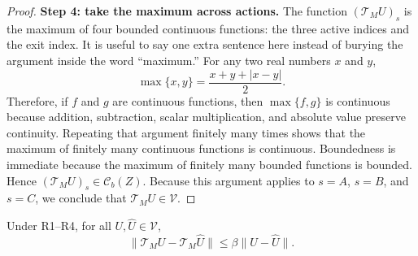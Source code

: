 \begin{proof}
\medskip\noindent\textbf{Step 4: take the maximum across actions.}
The function $(\mathcal T_MU)_s$ is the maximum of four bounded continuous functions: the three active indices and the exit index. It is useful to say one extra sentence here instead of burying the argument inside the word ``maximum.'' For any two real numbers $x$ and $y$,
\[
\max\{x,y\}=\frac{x+y+|x-y|}{2}.
\]
Therefore, if $f$ and $g$ are continuous functions, then $\max\{f,g\}$ is continuous because addition, subtraction, scalar multiplication, and absolute value preserve continuity. Repeating that argument finitely many times shows that the maximum of finitely many continuous functions is continuous. Boundedness is immediate because the maximum of finitely many bounded functions is bounded. Hence $(\mathcal T_MU)_s\in\mathcal C_b(Z)$. Because this argument applies to $s=A$, $s=B$, and $s=C$, we conclude that $\mathcal T_MU\in\mathcal V$.
\end{proof}

\begin{lemma}
Under R1--R4, for all $U,\widehat U\in\mathcal V$,
\[
\|\mathcal T_MU-\mathcal T_M\widehat U\|\le\beta\|U-\widehat U\|.
\]
\end{lemma}

